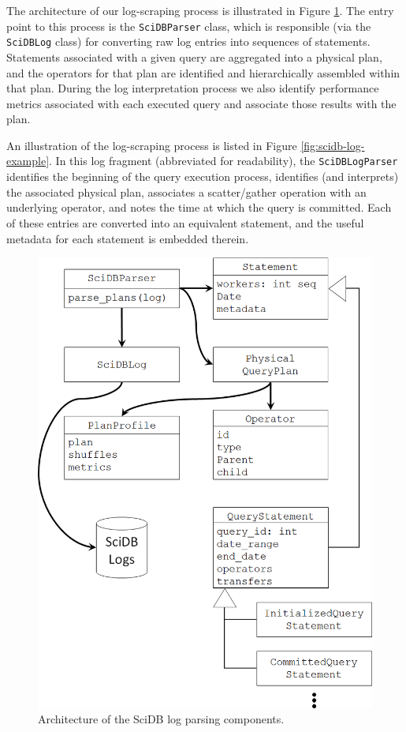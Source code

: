 \documentclass{chi2009}
\begin{document}
The architecture of our log-scraping process is illustrated in Figure \ref{fig:scidb-log-parsing}.  The entry point to this process is the \texttt{SciDBParser} class, which is responsible (via the \texttt{SciDBLog} class) for converting raw log entries into sequences of statements.  Statements associated with a given query are aggregated into a physical plan, and the operators for that plan are identified and hierarchically assembled within that plan.  During the log interpretation process we also identify performance metrics associated with each executed query and associate those results with the plan.

An illustration of the log-scraping process is listed in Figure \ref{fig:scidb-log-example}.  In this log fragment (abbreviated for readability), the \texttt{SciDBLogParser} identifies the beginning of the query execution process, identifies (and interprets) the associated physical plan, associates a scatter/gather operation with an underlying operator, and notes the time at which the query is committed.  Each of these entries are converted into an equivalent statement, and the useful metadata for each statement is embedded therein.

\begin{figure}[h]
\begin{center}
\includegraphics[scale=0.25]{log-scraping.png}
\end{center}
\caption{Architecture of the SciDB log parsing components.}
\label{fig:scidb-log-parsing}
\end{figure}
\end{document}
